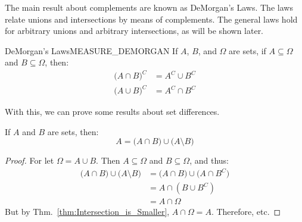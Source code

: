             The main result about complements are known as
            DeMorgan's Laws. The laws relate unions and
            intersections by means of complements. The general
            laws hold for arbitrary unions and arbitrary
            intersections, as will be shown later.
            \begin{ftheorem}{DeMorgan's Laws}{MEASURE_DEMORGAN}
                If $A$, $B$, and $\Omega$ are sets, if
                $A\subseteq\Omega$ and $B\subseteq\Omega$, then:
                \begin{subequations}
                    \begin{align}
                        \big(A\cap{B}\big)^{C}
                        &=A^{C}\cup{B}^{C}\\
                        \big(A\cup{B}\big)^{C}
                        &=A^{C}\cap{B}^{C}
                    \end{align}
                \end{subequations}
            \end{ftheorem}
            With this, we can prove some results about
            set differences.
            \begin{theorem}
                If $A$ and $B$ are sets, then:
                \begin{equation}
                    A=\big(A\cap{B}\big)
                        \cup\big(A\setminus{B}\big)
                \end{equation}
            \end{theorem}
            \begin{proof}
                For let $\Omega=A\cup{B}$. Then
                $A\subseteq\Omega$ and $B\subseteq\Omega$,
                and thus:
                \begin{subequations}
                    \begin{align}
                        \big(A\cap{B})\cup\big(A\setminus{B}\big)
                        &=\big(A\cap{B}\big)
                            \cup\big(A\cap{B}^{C}\big)\\
                        &=A\cap(B\cup{B}^{C})\\
                        &=A\cap\Omega
                    \end{align}
                \end{subequations}
                But by Thm.~\ref{thm:Intersection_is_Smaller},
                $A\cap\Omega=A$. Therefore, etc.
            \end{proof}
